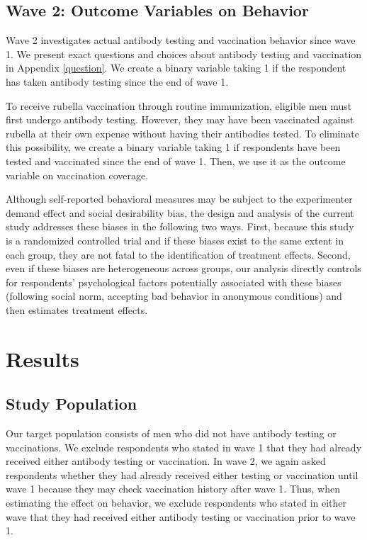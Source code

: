 \documentclass[
]{article}
\begin{document}
\hypertarget{wave2}{%
\subsection{Wave 2: Outcome Variables on Behavior}\label{wave2}}

Wave 2 investigates actual antibody testing and vaccination behavior since wave 1. We present exact questions and choices about antibody testing and vaccination in Appendix \ref{question}. We create a binary variable taking 1 if the respondent has taken antibody testing since the end of wave 1.

To receive rubella vaccination through routine immunization, eligible men must first undergo antibody testing. However, they may have been vaccinated against rubella at their own expense without having their antibodies tested. To eliminate this possibility, we create a binary variable taking 1 if respondents have been tested and vaccinated since the end of wave 1. Then, we use it as the outcome variable on vaccination coverage.

Although self-reported behavioral measures may be subject to the experimenter demand effect and social desirability bias, the design and analysis of the current study addresses these biases in the following two ways. First, because this study is a randomized controlled trial and if these biases exist to the same extent in each group, they are not fatal to the identification of treatment effects. Second, even if these biases are heterogeneous across groups, our analysis directly controls for respondents' psychological factors potentially associated with these biases (following social norm, accepting bad behavior in anonymous conditions) and then estimates treatment effects.

\hypertarget{results}{%
\section{Results}\label{results}}

\hypertarget{sample}{%
\subsection{Study Population}\label{sample}}

Our target population consists of men who did not have antibody testing or vaccinations. We exclude respondents who stated in wave 1 that they had already received either antibody testing or vaccination. In wave 2, we again asked respondents whether they had already received either testing or vaccination until wave 1 because they may check vaccination history after wave 1. Thus, when estimating the effect on behavior, we exclude respondents who stated in either wave that they had received either antibody testing or vaccination prior to wave 1.
\end{document}
